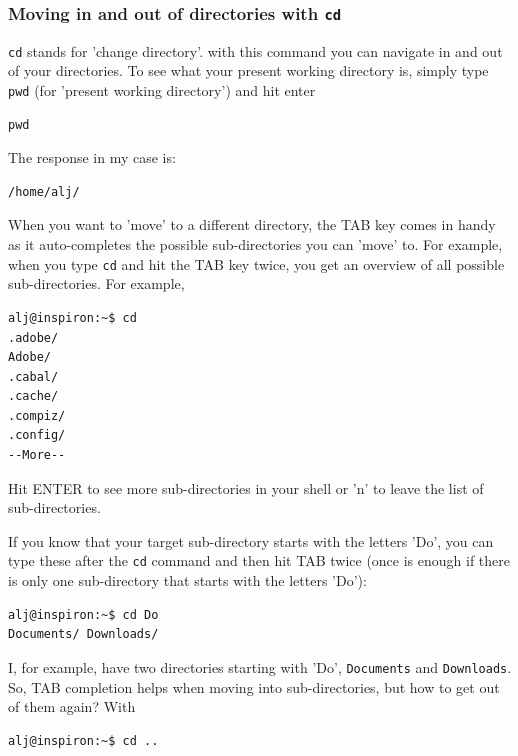 \documentclass[11pt]{article}
\begin{document}
\subsubsection{Moving in and out of directories with \texttt{cd}}
\label{sec:orgheadline3}
\texttt{cd} stands for 'change directory'. with this command you can navigate
in and out of your directories. To see what your present working
directory is, simply type \texttt{pwd} (for 'present working directory') and
hit enter

\begin{verbatim}
pwd
\end{verbatim}

The response in my case is:

\begin{verbatim}
/home/alj/
\end{verbatim}

When you want to 'move' to a different directory, the TAB key comes in
handy as it auto-completes the possible sub-directories you can 'move'
to. For example, when you type \texttt{cd} and hit the TAB key twice, you get an
overview of all possible sub-directories. For example,

\begin{verbatim}
alj@inspiron:~$ cd 
.adobe/
Adobe/
.cabal/
.cache/
.compiz/
.config/
--More--
\end{verbatim}

Hit ENTER to see more sub-directories in your shell or 'n' to leave the
list of sub-directories.

If you know that your target sub-directory starts with the letters
'Do', you can type these after the \texttt{cd} command and then hit TAB twice
(once is enough if there is only one sub-directory that starts with the
letters 'Do'):

\begin{verbatim}
alj@inspiron:~$ cd Do
Documents/ Downloads/
\end{verbatim}

I, for example, have two directories starting with 'Do', \texttt{Documents}
and \texttt{Downloads}. So, TAB completion helps when moving into
sub-directories, but how to get out of them again? With

\begin{verbatim}
alj@inspiron:~$ cd ..
\end{verbatim}
\end{document}
